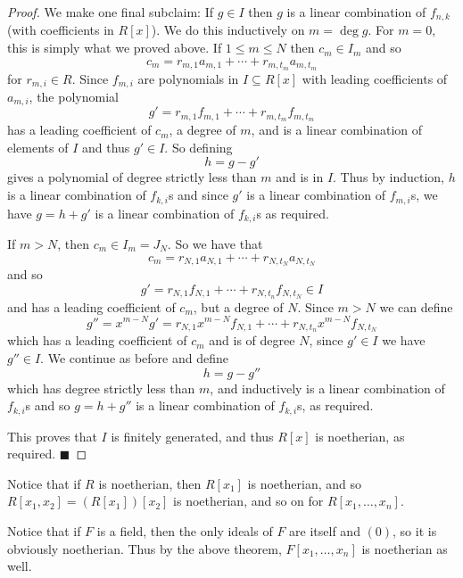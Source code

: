 \documentclass[10pt]{article}
\def\qed{\hskip1cm\hbox{}\hfill$\blacksquare$}
\begin{document}
\begin{proof}
    We make one final subclaim:
    If $g\in I$ then $g$ is a linear combination of $f_{n,k}$ (with coefficients in $R[x]$).
    We do this inductively on $m=\deg g$.
    For $m=0$, this is simply what we proved above.
    If $1\leq m\leq N$ then $c_m\in I_m$ and so
    \[ c_m = r_{m,1}a_{m,1} + \cdots + r_{m,t_m}a_{m,t_m} \]
    for $r_{m,i}\in R$.
    Since $f_{m,i}$ are polynomials in $I\subseteq R[x]$ with leading coefficients of $a_{m,i}$, the polynomial
    \[ g' = r_{m,1}f_{m,1} + \cdots + r_{m,t_m}f_{m,t_m} \]
    has a leading coefficient of $c_m$, a degree of $m$, and is a linear combination of elements of $I$ and thus $g'\in I$.
    So defining
    \[ h = g - g' \]
    gives a polynomial of degree strictly less than $m$ and is in $I$.
    Thus by induction, $h$ is a linear combination of $f_{k,i}$s and since $g'$ is a linear combination of $f_{m,i}$s, we have $g=h+g'$ is a linear combination of $f_{k,i}$s as required.

    If $m>N$, then $c_m\in I_m=J_N$.
    So we have that
    \[ c_m = r_{N,1}a_{N,1} + \cdots + r_{N,t_N}a_{N,t_N} \]
    and so
    \[ g' = r_{N,1}f_{N,1} + \cdots + r_{N,t_n}f_{N,t_N}\in I \]
    and has a leading coefficient of $c_m$, but a degree of $N$.
    Since $m>N$ we can define
    \[ g'' = x^{m-N}g' = r_{N,1}x^{m-N}f_{N,1} + \cdots + r_{N,t_n}x^{m-N}f_{N,t_N} \]
    which has a leading coefficient of $c_m$ and is of degree $N$, since $g'\in I$ we have $g''\in I$.
    We continue as before and define
    \[ h = g - g'' \]
    which has degree strictly less than $m$, and inductively is a linear combination of $f_{k,i}$s and so $g=h+g''$ is a linear combination of $f_{k,i}$s, as required.

    This proves that $I$ is finitely generated, and thus $R[x]$ is noetherian, as required.
    \qed


\end{proof}

Notice that if $R$ is noetherian, then $R[x_1]$ is noetherian, and so $R[x_1,x_2]=(R[x_1])[x_2]$ is noetherian, and so on for $R[x_1,\dots,x_n]$.

Notice that if $F$ is a field, then the only ideals of $F$ are itself and $(0)$, so it is obviously noetherian.
Thus by the above theorem, $F[x_1,\dots,x_n]$ is noetherian as well.
\end{document}
